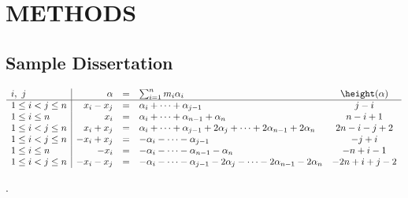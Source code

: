\chapter{METHODS}

\section{Sample Dissertation}
\lipsum[2-5]


\begin{table}[h!tb]
  \footnotesize {}
  \renewcommand{\arraystretch}{1.3}
  \begin{equation*}
    \begin{array}{l|rclc}
      i,\ j &\alpha&=&\sum_{i=1}^n m_i\alpha_i&\height(\alpha)\\\hline
      1\leq i< j\leq n&  x_i-x_j& =& \alpha_{i}+ \dots +\alpha_{j-1}& j-i \\
      1\leq i\leq n& x_i&=& \alpha_i+\dots +\alpha_{n-1}+ \alpha_n &
      n-i+1\\ 
      1\leq i< j\leq n& x_i+x_j&=& \alpha_i+ \dots +\alpha_{j-1} + 2\alpha_j+
      \dots +2\alpha_{n-1} +2\alpha_n& 2n-i-j+2 \\ 
      1\leq i< j\leq n& - x_i+x_j& =& -\alpha_{i}- \dots -\alpha_{j-1}& -j+i \\
      1\leq i\leq n& -x_i &= &-\alpha_i-\dots -\alpha_{n-1}- \alpha_n &
      -n+i-1\\ 
      1\leq i< j\leq n&  -x_i-x_j&=& -\alpha_i- \dots -\alpha_{j-1} - 2\alpha_j-
      \dots -2\alpha_{n-1} -2\alpha_n& -2n+i+j-2   
    \end{array}  
  \end{equation*}
  \caption{Roots expressed as linear combinations of vectors in
    $\Pi$}\label{tab:xxx} 
\end{table}

\lipsum[1-3]
 \cite{zinnmeister:thermodynamic}.


